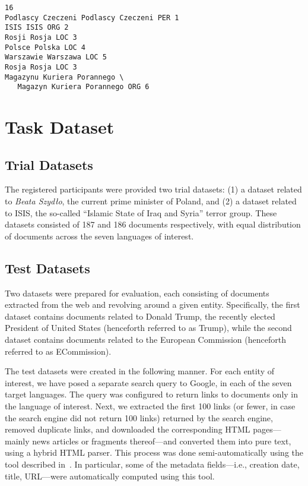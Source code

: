 \documentclass[11pt]{article}
\begin{document}
\begin{small}
\begin{verbatim}
16
Podlascy Czeczeni Podlascy Czeczeni PER 1
ISIS ISIS ORG 2
Rosji Rosja LOC 3
Polsce Polska LOC 4
Warszawie Warszawa LOC 5
Rosja Rosja LOC 3
Magazynu Kuriera Porannego \
   Magazyn Kuriera Porannego ORG 6
\end{verbatim}	    
\end{small}

\section{Task Dataset}
\label{sec:annotation}

\subsection{Trial Datasets}

The registered participants were provided two trial datasets:
(1) a dataset related to {\em Beata Szydło}, the current prime minister of Poland, and (2)
a dataset related to ISIS, the so-called ``Islamic State of Iraq and Syria'' terror group.
These datasets consisted of 187 and 186 documents respectively, with
equal distribution of documents across the seven languages of interest.

\subsection{Test Datasets}

Two datasets were prepared for evaluation, each consisting of documents
extracted from the web and revolving around a given entity.  Specifically, the
first dataset contains documents related to Donald Trump, the recently elected
President of United States (henceforth referred to as {\sc Trump}), while the
second dataset contains documents related to the European Commission
(henceforth referred to as {\sc ECommission}).

The test datasets were created in the following manner.  For each entity
of interest, we have posed a separate search query to Google, in each of
the seven target languages.  The query was configured to return links to
documents only in the language of interest.  Next, we extracted the first
100 links (or fewer, in case the search engine did not return 100
links) returned by the search engine, removed duplicate links, and
downloaded the corresponding HTML pages---mainly news articles or
fragments thereof---and converted them into pure text, using a hybrid
HTML parser.  This process was done semi-automatically using the tool
described in~\cite{Crawley:ea:2010}.  In particular, some of the metadata
fields---i.e., creation date, title, URL---were automatically computed
using this tool.
\end{document}

